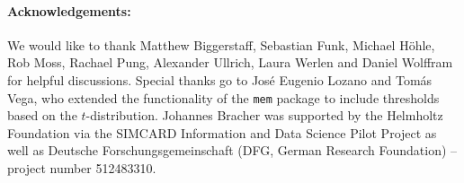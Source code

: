 \documentclass[12pt]{article}
\begin{document}



\paragraph{Acknowledgements:}

We would like to thank Matthew Biggerstaff, Sebastian Funk, Michael H\"ohle, Rob Moss, Rachael Pung, Alexander Ullrich, Laura Werlen and Daniel Wolffram for helpful discussions. Special thanks go to Jos\'e Eugenio Lozano and Tom\'as Vega, who extended the functionality of the \texttt{mem} package to include thresholds based on the $t$-distribution. Johannes Bracher was supported by the Helmholtz Foundation via the SIMCARD Information and Data Science Pilot Project as well as Deutsche Forschungsgemeinschaft (DFG, German Research Foundation) -- project number 512483310.

{\footnotesize


}
\end{document}
